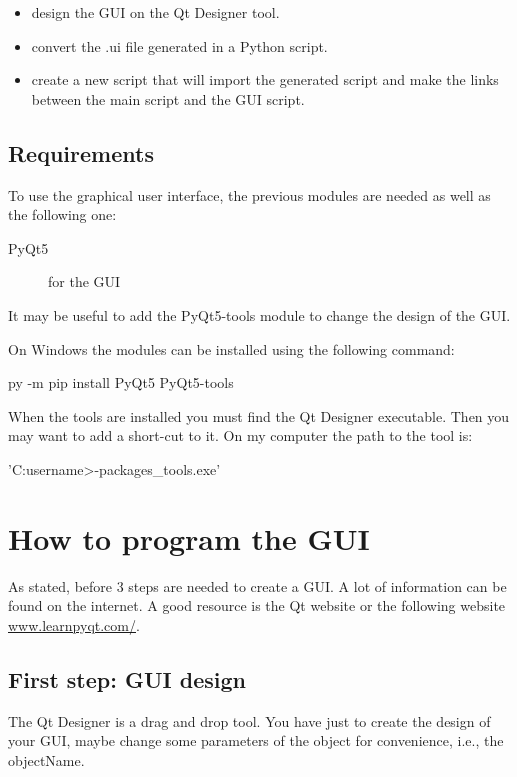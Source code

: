\documentclass[english, 12 pt, openany, oneside]{book}
\begin{document}
\begin{itemize}
\item design the GUI on the Qt Designer tool.
\item convert the .ui file generated in a Python script.
\item create a new script that will import the generated script and make the links between the main script and the GUI script.
\end{itemize}

\subsection{Requirements}
To use the graphical user interface, the previous modules are needed as well as the following one:

\begin{description}
\item[PyQt5] for the GUI
\end{description}

It may be useful to add the PyQt5-tools module to change the design of the GUI.

On Windows the modules can be installed using the following command:
\begin{pyverbatim}
py -m pip install PyQt5 PyQt5-tools
\end{pyverbatim}

When the tools are installed you must find the Qt Designer executable. Then you may want to add a short-cut to it. On my computer the path to the tool is:
\begin{pyverbatim}[][breaklines]
'C:\Users\<username>\AppData\Local\Programs\Python{}\Lib\site-packages_tools\Qt\bin\designer.exe'
\end{pyverbatim}

\section{How to program the GUI}
As stated, before 3 steps are needed to create a GUI. A lot of information can be found on the internet. A good resource is the Qt website or the following website \url{www.learnpyqt.com/}.

\subsection{First step: GUI design}
The Qt Designer is a drag and drop tool. You have just to create the design of your GUI, maybe change some parameters of the object for convenience, i.e., the objectName.
\end{document}
